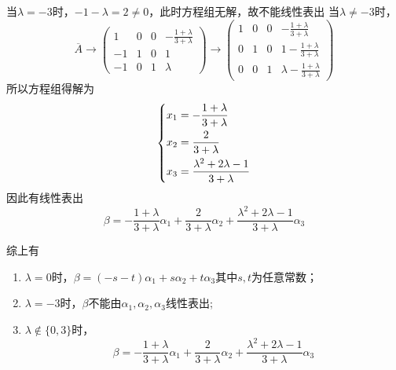 \begin{solution}
\begin{enumerate}[(1)]
              \subitem 当$\lambda=-3$时，$-1-\lambda=2\neq 0$，此时方程组无解，故不能线性表出
              \subitem 当$\lambda\neq-3$时，
              \[
                  \overline{A}
                  \longrightarrow
                  \left(\begin{array}{ccc|c}
                          1  & 0 & 0 & -\frac{1+\lambda}{3+\lambda} \\
                          -1 & 1 & 0 & 1                            \\
                          -1 & 0 & 1 & \lambda
                      \end{array}\right)
                  \longrightarrow
                  \left(\begin{array}{ccc|c}
                          1 & 0 & 0 & -\frac{1+\lambda}{3+\lambda}         \\
                          0 & 1 & 0 & 1 -\frac{1+\lambda}{3+\lambda}       \\
                          0 & 0 & 1 & \lambda -\frac{1+\lambda}{3+\lambda}
                      \end{array}\right)
              \]
              所以方程组得解为
              \[
                  \begin{dcases}
                      x_1 = -\frac{1+\lambda}{3+\lambda} \\
                      x_2 = \frac{2}{3+\lambda}          \\
                      x_3 = \frac{\lambda^2+2\lambda-1}{3+\lambda}
                  \end{dcases}
              \]
              因此有线性表出
              \[\beta = -\frac{1+\lambda}{3+\lambda}\alpha_1 + \frac{2}{3+\lambda}\alpha_2 + \frac{\lambda^2+2\lambda-1}{3+\lambda}\alpha_3 \]
    \end{enumerate}
    综上有
    \begin{enumerate}[(1)]
        \item $\lambda=0$时，$\beta = (-s-t)\alpha_1+s\alpha_2+t\alpha_3$其中$s,t$为任意常数；
        \item $\lambda=-3$时，$\beta$不能由$\alpha_1,\alpha_2,\alpha_3$线性表出;
        \item $\lambda\notin\{0,3\}$时，
              \[ \beta = -\frac{1+\lambda}{3+\lambda}\alpha_1 + \frac{2}{3+\lambda}\alpha_2 + \frac{\lambda^2+2\lambda-1}{3+\lambda}\alpha_3 \]
    \end{enumerate}
\end{solution}

